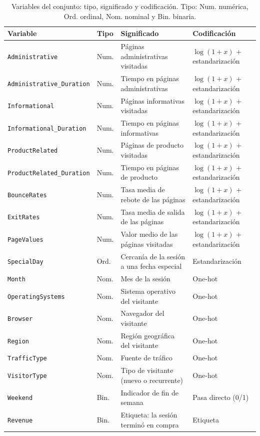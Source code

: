 \documentclass[journal]{IEEEtran}
\begin{document}
\begin{table}[t]
\centering
\caption{Variables del conjunto: tipo, significado y codificación. Tipo: Num. numérica,
Ord. ordinal, Nom. nominal y Bin. binaria.}
\label{tab:variables}
\scriptsize
\renewcommand{\arraystretch}{1.03}
\setlength{\tabcolsep}{3pt}
\begin{tabular}{@{}p{3.3cm} p{1.5cm} p{6.3cm} p{4.6cm}@{}}
\toprule
\textbf{Variable} & \textbf{Tipo} & \textbf{Significado} & \textbf{Codificación} \\
\midrule
\texttt{Administrative} & Num. & Páginas administrativas visitadas & $\log(1+x)$ + estandarización \\
\texttt{Administrative\_Duration} & Num. & Tiempo en páginas administrativas & $\log(1+x)$ + estandarización \\
\texttt{Informational} & Num. & Páginas informativas visitadas & $\log(1+x)$ + estandarización \\
\texttt{Informational\_Duration} & Num. & Tiempo en páginas informativas & $\log(1+x)$ + estandarización \\
\texttt{ProductRelated} & Num. & Páginas de producto visitadas & $\log(1+x)$ + estandarización \\
\texttt{ProductRelated\_Duration} & Num. & Tiempo en páginas de producto & $\log(1+x)$ + estandarización \\
\texttt{BounceRates} & Num. & Tasa media de rebote de las páginas & $\log(1+x)$ + estandarización \\
\texttt{ExitRates} & Num. & Tasa media de salida de las páginas & $\log(1+x)$ + estandarización \\
\texttt{PageValues} & Num. & Valor medio de las páginas visitadas & $\log(1+x)$ + estandarización \\
\texttt{SpecialDay} & Ord. & Cercanía de la sesión a una fecha especial & Estandarización \\
\texttt{Month} & Nom. & Mes de la sesión & One-hot \\
\texttt{OperatingSystems} & Nom. & Sistema operativo del visitante & One-hot \\
\texttt{Browser} & Nom. & Navegador del visitante & One-hot \\
\texttt{Region} & Nom. & Región geográfica del visitante & One-hot \\
\texttt{TrafficType} & Nom. & Fuente de tráfico & One-hot \\
\texttt{VisitorType} & Nom. & Tipo de visitante (nuevo o recurrente) & One-hot \\
\texttt{Weekend} & Bin. & Indicador de fin de semana & Pasa directo (0/1) \\
\texttt{Revenue} & Bin. & Etiqueta: la sesión terminó en compra & Etiqueta \\
\bottomrule
\end{tabular}
\end{table}
\end{document}
